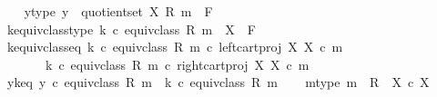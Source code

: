 \begin{isabellebody}
\ \ \isamarkupfalse%
\ y{\isacharunderscore}{\kern0pt}type{\isacharcolon}{\kern0pt}\ {\isachardoublequoteopen}y\ {\isacharcolon}{\kern0pt}\ quotient{\isacharunderscore}{\kern0pt}set\ X\ {\isacharparenleft}{\kern0pt}R{\isacharcomma}{\kern0pt}\ m{\isacharparenright}{\kern0pt}\ {\isasymrightarrow}\ F{\isachardoublequoteclose}\isanewline
\ \ \isamarkupfalse%
\ k{\isacharunderscore}{\kern0pt}equiv{\isacharunderscore}{\kern0pt}class{\isacharunderscore}{\kern0pt}type{\isacharcolon}{\kern0pt}\ {\isachardoublequoteopen}k\ {\isasymcirc}\isactrlsub c\ equiv{\isacharunderscore}{\kern0pt}class\ {\isacharparenleft}{\kern0pt}R{\isacharcomma}{\kern0pt}\ m{\isacharparenright}{\kern0pt}\ {\isacharcolon}{\kern0pt}\ X\ {\isasymrightarrow}\ F{\isachardoublequoteclose}\isanewline
\ \ \isamarkupfalse%
\ k{\isacharunderscore}{\kern0pt}equiv{\isacharunderscore}{\kern0pt}class{\isacharunderscore}{\kern0pt}eq{\isacharcolon}{\kern0pt}\ {\isachardoublequoteopen}{\isacharparenleft}{\kern0pt}k\ {\isasymcirc}\isactrlsub c\ equiv{\isacharunderscore}{\kern0pt}class\ {\isacharparenleft}{\kern0pt}R{\isacharcomma}{\kern0pt}\ m{\isacharparenright}{\kern0pt}{\isacharparenright}{\kern0pt}\ {\isasymcirc}\isactrlsub c\ left{\isacharunderscore}{\kern0pt}cart{\isacharunderscore}{\kern0pt}proj\ X\ X\ {\isasymcirc}\isactrlsub c\ m\ {\isacharequal}{\kern0pt}\isanewline
\ \ \ \ \ \ \ {\isacharparenleft}{\kern0pt}k\ {\isasymcirc}\isactrlsub c\ equiv{\isacharunderscore}{\kern0pt}class\ {\isacharparenleft}{\kern0pt}R{\isacharcomma}{\kern0pt}\ m{\isacharparenright}{\kern0pt}{\isacharparenright}{\kern0pt}\ {\isasymcirc}\isactrlsub c\ right{\isacharunderscore}{\kern0pt}cart{\isacharunderscore}{\kern0pt}proj\ X\ X\ {\isasymcirc}\isactrlsub c\ m{\isachardoublequoteclose}\isanewline
\ \ \isamarkupfalse%
\ y{\isacharunderscore}{\kern0pt}k{\isacharunderscore}{\kern0pt}eq{\isacharcolon}{\kern0pt}\ {\isachardoublequoteopen}y\ {\isasymcirc}\isactrlsub c\ equiv{\isacharunderscore}{\kern0pt}class\ {\isacharparenleft}{\kern0pt}R{\isacharcomma}{\kern0pt}\ m{\isacharparenright}{\kern0pt}\ {\isacharequal}{\kern0pt}\ k\ {\isasymcirc}\isactrlsub c\ equiv{\isacharunderscore}{\kern0pt}class\ {\isacharparenleft}{\kern0pt}R{\isacharcomma}{\kern0pt}\ m{\isacharparenright}{\kern0pt}{\isachardoublequoteclose}\isanewline
\isanewline
\ \ \isamarkupfalse%
\ m{\isacharunderscore}{\kern0pt}type{\isacharcolon}{\kern0pt}\ {\isachardoublequoteopen}m\ {\isacharcolon}{\kern0pt}\ R\ {\isasymrightarrow}\ X\ {\isasymtimes}\isactrlsub c\ X{\isachardoublequoteclose}\isanewline

\end{isabellebody}
